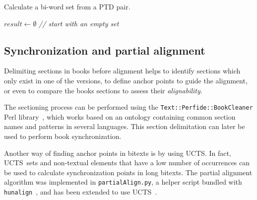 \documentclass[a4paper,russian,UKenglish]{oasics}
\def\UCTSS{{\sc UCTS}}
\def\PTDS{{\sc PTDs}}
\begin{document}
\begin{algorithm}
   \small
   \DontPrintSemicolon
   \caption{Calculate a bi-word set from a PTD pair.\label{alg:bws}}
   \BlankLine
   $result \leftarrow \emptyset$ \hfill \textit{// start with an empty set}\;
\end{algorithm}




\subsection{Synchronization and partial alignment}
\label{pa_ucts}
Delimiting sections in books before alignment helps to identify sections which only exist in one of the versions, to define anchor points to guide the alignment, or even to compare the books sections to assess their \textit{alignability}. 

The sectioning process can be performed using the \texttt{Text::Perfide::BookCleaner} Perl library~\cite{santos2011bookcleaner,andre2011building}, which works based on an ontology containing common section names and patterns in several languages. This section delimitation can later be used to perform book synchronization.

Another way of finding anchor points in bitexts is by using 
\UCTSS. In fact, \UCTSS\ sets and non-textual elements that have a low 
number of occurrences can be used to calculate synchronization 
points in long bitexts. The partial alignment algorithm was
implemented in \texttt{partialAlign.py}, a helper script bundled with
\texttt{hunalign}~\cite{varga2005parallel}, and has been extended to 
use \UCTSS{}~\cite{santos2012structural}.
\end{document}
